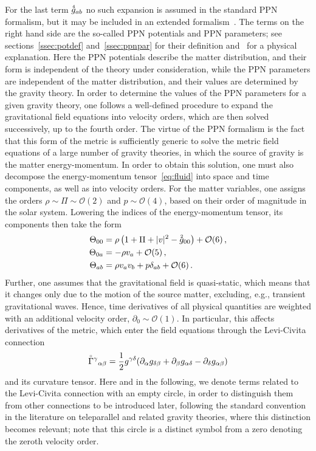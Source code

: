 \documentclass[notitlepage,a4paper,aps,prd,onecolumn,superscriptaddress,nofootinbib,groupedaddress,longbibliography]{revtex4-1}
\newcommand{\order}[2]{\accentset{#2}{#1}}
\newcommand{\lc}[1]{\accentset{\circ}{#1}}
\begin{document}
For the last term \(\order{g}{4}_{ab}\) no such expansion is assumed in the standard PPN formalism, but it may be included in an extended formalism~\cite{Richter:1982zz,Richter:1982zza}. The terms on the right hand side are the so-called PPN potentials and PPN parameters; see sections~\ref{ssec:potdef} and~\ref{ssec:ppnpar} for their definition and~\cite{Will:1993ns} for a physical explanation. Here the PPN potentials describe the matter distribution, and their form is independent of the theory under consideration, while the PPN parameters are independent of the matter distribution, and their values are determined by the gravity theory. In order to determine the values of the PPN parameters for a given gravity theory, one follows a well-defined procedure to expand the gravitational field equations into velocity orders, which are then solved successively, up to the fourth order. The virtue of the PPN formalism is the fact that this form of the metric is sufficiently generic to solve the metric field equations of a large number of gravity theories, in which the source of gravity is the matter energy-momentum. In order to obtain this solution, one must also decompose the energy-momentum tensor~\eqref{eq:fluid} into space and time components, as well as into velocity orders. For the matter variables, one assigns the orders \(\rho \sim \Pi \sim \mathcal{O}(2)\) and \(p \sim \mathcal{O}(4)\), based on their order of magnitude in the solar system. Lowering the indices of the energy-momentum tensor, its components then take the form
\begin{subequations}\label{eq:energymomentum}
\begin{align}
\Theta_{00} &= \rho\left(1 + \Pi + |v|^2 - \order{g}{2}_{00}\right) + \mathcal{O}(6)\,,\\
\Theta_{0a} &= -\rho v_a + \mathcal{O}(5)\,,\\
\Theta_{ab} &= \rho v_av_b + p\delta_{ab} + \mathcal{O}(6)\,.
\end{align}
\end{subequations}
Further, one assumes that the gravitational field is quasi-static, which means that it changes only due to the motion of the source matter, excluding, e.g., transient gravitational waves. Hence, time derivatives of all physical quantities are weighted with an additional velocity order, \(\partial_0 \sim \mathcal{O}(1)\). In particular, this affects derivatives of the metric, which enter the field equations through the Levi-Civita connection
\begin{equation}\label{eq:levicivita}
\lc{\Gamma}^{\gamma}{}_{\alpha\beta} = \frac{1}{2}g^{\gamma\delta}(\partial_{\alpha}g_{\delta\beta} + \partial_{\beta}g_{\alpha\delta} - \partial_{\delta}g_{\alpha\beta})
\end{equation}
and its curvature tensor. Here and in the following, we denote terms related to the Levi-Civita connection with an empty circle, in order to distinguish them from other connections to be introduced later, following the standard convention in the literature on teleparallel and related gravity theories, where this distinction becomes relevant; note that this circle is a distinct symbol from a zero denoting the zeroth velocity order.
\end{document}
